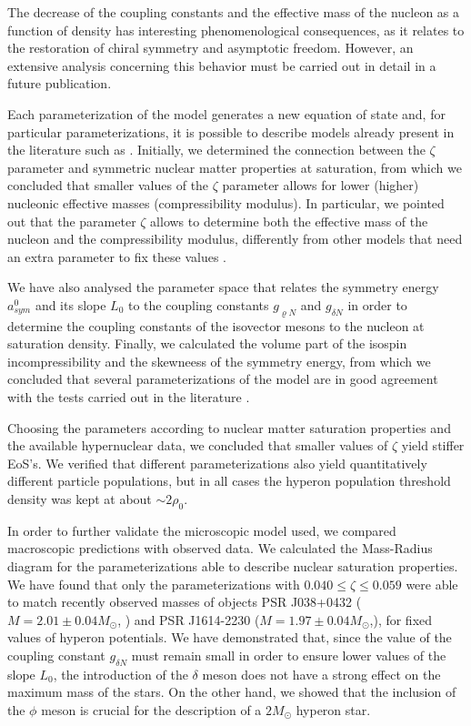 \documentclass[twocolumn,showpacs,aps]{revtex4}
\begin{document}
The decrease of the coupling constants and the effective mass of the nucleon as a function of density 
has interesting phenomenological consequences, as it relates to the restoration of chiral symmetry and asymptotic freedom.
However, an extensive analysis concerning this behavior must be carried out in detail in a future publication.

Each parameterization of the model generates a new equation of state and, for particular parameterizations, 
it is possible to describe models already present in the literature such as \cite{Walecka1986, Zimanyi:1990np}.
Initially, we determined the connection between the $\zeta$ parameter and symmetric nuclear matter properties at saturation,
from which we concluded that smaller values of the $\zeta$ parameter allows for lower (higher) nucleonic effective masses (compressibility modulus).
In particular, we pointed out that the parameter $\zeta$ allows to determine both the effective mass of the nucleon and the  
compressibility modulus, differently from other models that need an extra parameter to fix these values \cite{Boguta:1977xi,Typel:1999yq}.

We have also analysed the parameter space that relates the symmetry energy $a_{sym}^0$ and its slope $L_0$ to 
the coupling constants $g_{\varrho N}$ and $g_{\delta N}$ in order to determine the coupling constants of the isovector mesons to the 
nucleon at saturation density. 
Finally, we calculated the volume part of the isospin incompressibility and the skewneess of the 
symmetry energy, from which we concluded that several parameterizations of the  model are in good agreement with the tests 
carried out in the literature \cite{Dutra:2014qga}.

Choosing the parameters according to nuclear matter saturation properties and the available hypernuclear data, 
we concluded that smaller values of $\zeta$ yield stiffer EoS's. 
We verified that different parameterizations also yield quantitatively different particle populations,
but in all cases the hyperon population threshold density was kept at about $\sim 2 \rho_0$.

In order to further validate the microscopic model used, we compared macroscopic predictions with observed data. 
We calculated the Mass-Radius diagram for the parameterizations able to describe nuclear saturation properties. 
We have found that only the parameterizations with $0.040 \leq \zeta \leq 0.059$ were able to match recently 
observed masses of objects PSR J038+0432 ($M = 2.01 \pm 0.04 M_\odot$, \cite{Antoniadis2013}) 
and PSR J1614-2230 ($M = 1.97 \pm 0.04 M_\odot$,\cite{Demorest2010}), for fixed values of hyperon potentials.  
We have demonstrated that, since the value of the coupling constant $g_{\delta N}$ must remain small in order to ensure
lower values of the slope $L_0$, the introduction of the $\delta$ meson does not have a strong effect on the maximum mass of the stars.
On the other hand, we showed that the inclusion of the $\phi$ meson is crucial for the description of a
$2M_{\odot}$ hyperon star.
\end{document}
